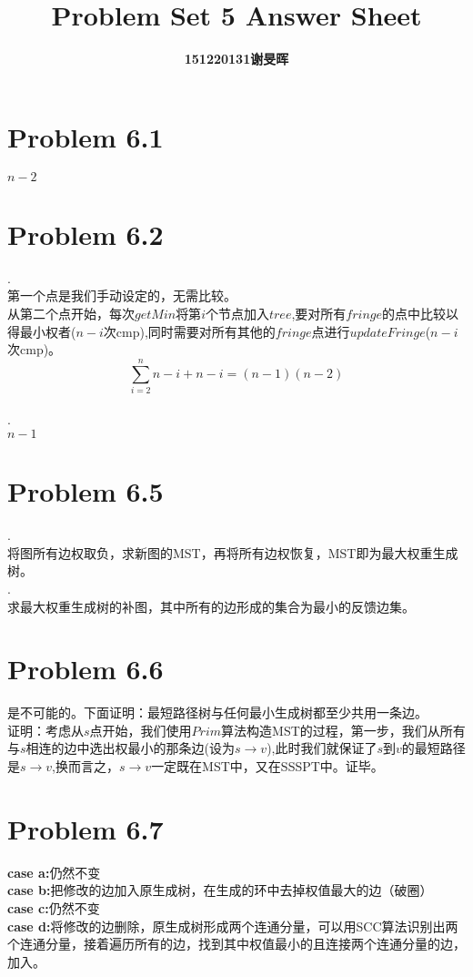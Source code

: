 \documentclass[twocolumn]{ctexart}
\begin{document}
	\title{Problem Set 5 Answer Sheet}
	\author{\textbf{151220131谢旻晖}}
	\date{}
	\maketitle
	
\section*{Problem 6.1}
\indent $n-2$

\section*{Problem 6.2}
.\\
\indent 第一个点是我们手动设定的，无需比较。\\
\indent
从第二个点开始，每次$getMin$将第$i$个节点加入$tree$,要对所有$fringe$的点中比较以得最小权者($n-i$次cmp),同时需要对所有其他的$fringe$点进行$updateFringe$($n-i$次cmp)。\\
\[
	\sum_{i=2}^{n}n-i+n-i=(n-1)(n-2)
\]
\\
.\\
\indent $n-1$

\section*{Problem 6.5}
.\\
\indent 将图所有边权取负，求新图的MST，再将所有边权恢复，MST即为最大权重生成树。\\
.\\
\indent 求最大权重生成树的补图，其中所有的边形成的集合为最小的反馈边集。

\section*{Problem 6.6}
\indent 是不可能的。下面证明：最短路径树与任何最小生成树都至少共用一条边。\\
\indent 证明：考虑从$s$点开始，我们使用$Prim$算法构造MST的过程，第一步，我们从所有与$s$相连的边中选出权最小的那条边(设为$s\rightarrow v$),此时我们就保证了$s$到$v$的最短路径是$s\rightarrow v$,换而言之，$s\rightarrow v$一定既在MST中，又在SSSPT中。证毕。

\section*{Problem 6.7}
\noindent\textbf{case a:}仍然不变\\
\textbf{case b:}把修改的边加入原生成树，在生成的环中去掉权值最大的边（破圈）\\
\textbf{case c:}仍然不变\\
\textbf{case d:}将修改的边删除，原生成树形成两个连通分量，可以用SCC算法识别出两个连通分量，接着遍历所有的边，找到其中权值最小的且连接两个连通分量的边，加入。\\
\end{document}
